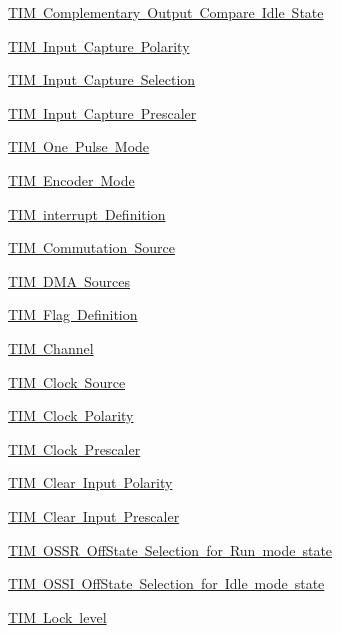 \begin{DoxyCompactItemize}
\item 
\mbox{\hyperlink{group___t_i_m___output___compare___n___idle___state}{T\+I\+M Complementary Output Compare Idle State}}
\item 
\mbox{\hyperlink{group___t_i_m___input___capture___polarity}{T\+I\+M Input Capture Polarity}}
\item 
\mbox{\hyperlink{group___t_i_m___input___capture___selection}{T\+I\+M Input Capture Selection}}
\item 
\mbox{\hyperlink{group___t_i_m___input___capture___prescaler}{T\+I\+M Input Capture Prescaler}}
\item 
\mbox{\hyperlink{group___t_i_m___one___pulse___mode}{T\+I\+M One Pulse Mode}}
\item 
\mbox{\hyperlink{group___t_i_m___encoder___mode}{T\+I\+M Encoder Mode}}
\item 
\mbox{\hyperlink{group___t_i_m___interrupt__definition}{T\+I\+M interrupt Definition}}
\item 
\mbox{\hyperlink{group___t_i_m___commutation___source}{T\+I\+M Commutation Source}}
\item 
\mbox{\hyperlink{group___t_i_m___d_m_a__sources}{T\+I\+M D\+M\+A Sources}}
\item 
\mbox{\hyperlink{group___t_i_m___flag__definition}{T\+I\+M Flag Definition}}
\item 
\mbox{\hyperlink{group___t_i_m___channel}{T\+I\+M Channel}}
\item 
\mbox{\hyperlink{group___t_i_m___clock___source}{T\+I\+M Clock Source}}
\item 
\mbox{\hyperlink{group___t_i_m___clock___polarity}{T\+I\+M Clock Polarity}}
\item 
\mbox{\hyperlink{group___t_i_m___clock___prescaler}{T\+I\+M Clock Prescaler}}
\item 
\mbox{\hyperlink{group___t_i_m___clear_input___polarity}{T\+I\+M Clear Input Polarity}}
\item 
\mbox{\hyperlink{group___t_i_m___clear_input___prescaler}{T\+I\+M Clear Input Prescaler}}
\item 
\mbox{\hyperlink{group___t_i_m___o_s_s_r___off___state___selection__for___run__mode__state}{T\+I\+M O\+S\+S\+R Off\+State Selection for Run mode state}}
\item 
\mbox{\hyperlink{group___t_i_m___o_s_s_i___off___state___selection__for___idle__mode__state}{T\+I\+M O\+S\+S\+I Off\+State Selection for Idle mode state}}
\item 
\mbox{\hyperlink{group___t_i_m___lock__level}{T\+I\+M Lock level}}

\end{DoxyCompactItemize}
